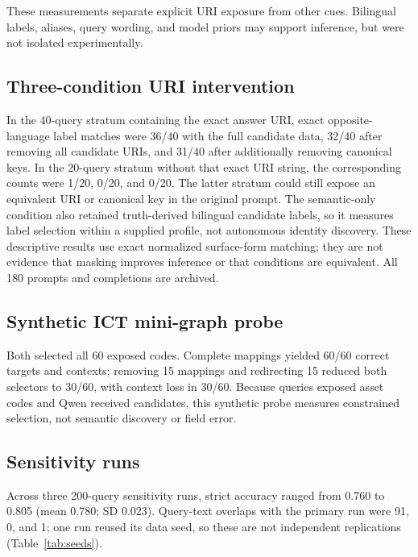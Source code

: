 \documentclass[a4paper,fleqn]{cas-dc}
\begin{document}
These measurements separate explicit URI exposure from other cues. Bilingual labels, aliases, query wording, and model priors may support inference, but were not isolated experimentally.

\begin{table}[t]
\centering\small

\caption{Primary results stratified by the exact answer-bearing URI string in the reconstructed prompt. URI absence does not imply absence of counterpart identifiers or other identity cues. Intervals are two-sided 95\% exact binomial intervals for strict accuracy. Two-hop work URIs are traversal targets, so exposure is not defined for that family.}
\label{tab:probe}
\end{table}

\subsection{Three-condition URI intervention}
In the 40-query stratum containing the exact answer URI, exact opposite-language label matches were 36/40 with the full candidate data, 32/40 after removing all candidate URIs, and 31/40 after additionally removing canonical keys. In the 20-query stratum without that exact URI string, the corresponding counts were 1/20, 0/20, and 0/20. The latter stratum could still expose an equivalent URI or canonical key in the original prompt. The semantic-only condition also retained truth-derived bilingual candidate labels, so it measures label selection within a supplied profile, not autonomous identity discovery. These descriptive results use exact normalized surface-form matching; they are not evidence that masking improves inference or that conditions are equivalent. All 180 prompts and completions are archived.

\subsection{Synthetic ICT mini-graph probe}
Both selected all 60 exposed codes. Complete mappings yielded 60/60 correct targets and contexts; removing 15 mappings and redirecting 15 reduced both selectors to 30/60, with context loss in 30/60. Because queries exposed asset codes and Qwen received candidates, this synthetic probe measures constrained selection, not semantic discovery or field error.

\subsection{Sensitivity runs}
Across three 200-query sensitivity runs, strict accuracy ranged from 0.760 to 0.805 (mean 0.780; SD 0.023). Query-text overlaps with the primary run were 91, 0, and 1; one run reused its data seed, so these are not independent replications (Table~\ref{tab:seeds}).
\end{document}
